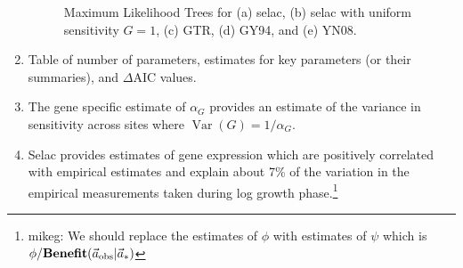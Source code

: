 \documentclass{article}
\newcommand{\DeltaAIC}{\ensuremath{\Delta\text{AIC}}\xspace}
\newcommand{\Funcaobsvec}{\ensuremath{\Func(\aobsvec|\aoptvec)}\xspace}
\newcommand{\Func}{\ensuremath{\text{\textbf{Benefit}}}\xspace}
\newcommand{\alphag}{\ensuremath{\alpha_G}\xspace}
\newcommand{\aobsvec}{\ensuremath{\Vec{a}_{\text{obs}}}\xspace}
\newcommand{\aoptvec}{\ensuremath{\Vec{a}_*}\xspace}
\DeclareMathOperator{\Var}{Var}
\begin{document}
\begin{enumerate}
\begin{figure}[H]
  \caption{Maximum Likelihood Trees for (a) selac, (b) selac with uniform sensitivity $G = 1$, (c) GTR, (d) GY94, and (e) YN08.}
  \label{fig:MleTrees}
\end{figure}
\item Table of number of parameters, estimates for key parameters (or their summaries), and \DeltaAIC values.
\item The gene specific estimate of \alphag provides an estimate of the variance in sensitivity across sites where $\Var(G) = 1/\alphag$.  
\item Selac provides estimates of gene expression which are positively correlated with empirical estimates and explain about 7\% of the variation in the empirical measurements taken during log growth phase.\footnote{mikeg: We should replace the estimates of $\phi$ with estimates of $\psi$ which is $\phi/\Funcaobsvec$} 


\end{enumerate}
\end{document}
